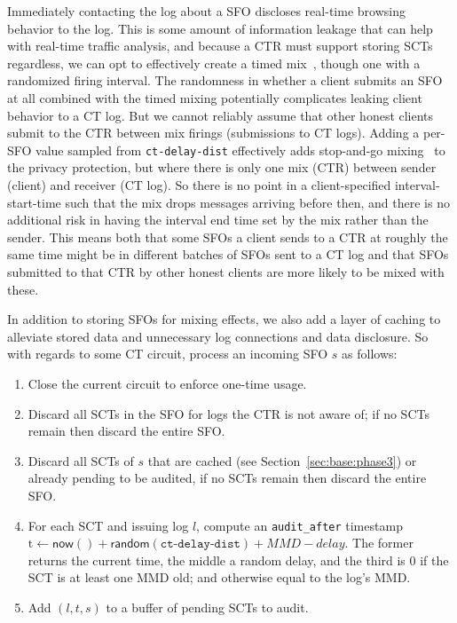 Immediately contacting the log about a SFO discloses real-time browsing behavior
to the log. This is some amount of information leakage that can help with real-time
traffic analysis, and because a CTR must support storing SCTs regardless, we can
opt to effectively create a timed mix~\cite{trickle02}, though one with a
randomized firing interval. The randomness in whether a client submits an SFO
at all combined with the timed mixing potentially complicates leaking client
behavior to a CT log. But we cannot reliably assume that other honest
clients submit to the CTR between mix firings (submissions to CT
logs). Adding a per-SFO value sampled from \texttt{ct-delay-dist}
effectively adds stop-and-go mixing~\cite{kesdogan:ih1998} to the
privacy protection, but where there is only one mix (CTR) between
sender (client) and receiver (CT log). So there is no point in a
client-specified interval-start-time such that the mix drops messages
arriving before then, and there is no additional risk in having the
interval end time set by the mix rather than the sender. This means
both that some SFOs a client sends to a CTR at roughly the same time
might be in different batches of SFOs sent to a CT log and that SFOs
submitted to that CTR by other honest clients are more likely to be
mixed with these.


In addition to storing SFOs for mixing effects, we also add a layer of caching to
alleviate stored data and unnecessary log connections and data disclosure. So with
regards to some CT circuit, process an incoming SFO $s$ as follows:
\begin{enumerate}
    \item\label{enm:storage:close} Close the current circuit to enforce one-time
        usage.
    \item\label{enm:storage:unrecognized} Discard all SCTs in the SFO for logs the
        CTR is not aware of; if no SCTs remain then discard the entire SFO.
    \item\label{enm:storage:cached}
        Discard all SCTs of $s$ that are cached (see Section~\ref{sec:base:phase3})
        or already pending to be audited, if no SCTs remain then discard the entire SFO.
    \item\label{enm:storage:audit-after} For each SCT and issuing log $l$, compute an \texttt{audit\_after}
        timestamp $\textrm{t} \gets \mathsf{now()} +
            \mathsf{random}(\texttt{ct-delay-dist}) + MMD-delay$.
        The former returns the current time, the middle a random delay, and the third
        is 0 if the SCT is at least one MMD old; and otherwise equal to the log's MMD.
    \item\label{enm:storage:store} Add $(l,t,s)$ to a buffer of pending SCTs to audit.
\end{enumerate}

